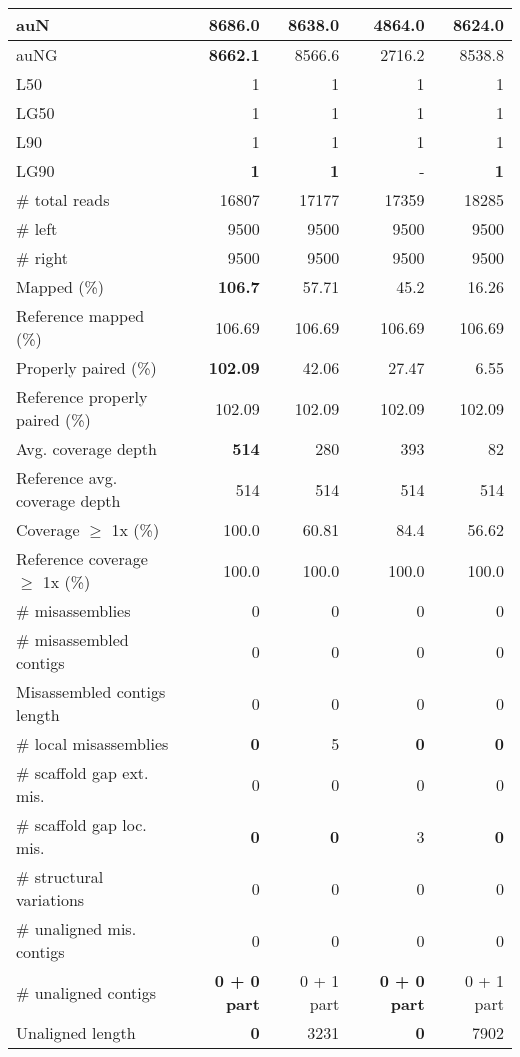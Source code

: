 \documentclass[12pt,a4paper]{article}
\begin{document}
\begin{table}[ht]
\begin{center}
\begin{tabular}{|l*{4}{|r}|}
auN & {\bf 8686.0} & 8638.0 & 4864.0 & 8624.0 \\ \hline
auNG & {\bf 8662.1} & 8566.6 & 2716.2 & 8538.8 \\ \hline
L50 & 1 & 1 & 1 & 1 \\ \hline
LG50 & 1 & 1 & 1 & 1 \\ \hline
L90 & 1 & 1 & 1 & 1 \\ \hline
LG90 & {\bf 1} & {\bf 1} & - & {\bf 1} \\ \hline
\# total reads & 16807 & 17177 & 17359 & 18285 \\ \hline
\# left & 9500 & 9500 & 9500 & 9500 \\ \hline
\# right & 9500 & 9500 & 9500 & 9500 \\ \hline
Mapped (\%) & {\bf 106.7} & 57.71 & 45.2 & 16.26 \\ \hline
Reference mapped (\%) & 106.69 & 106.69 & 106.69 & 106.69 \\ \hline
Properly paired (\%) & {\bf 102.09} & 42.06 & 27.47 & 6.55 \\ \hline
Reference properly paired (\%) & 102.09 & 102.09 & 102.09 & 102.09 \\ \hline
Avg. coverage depth & {\bf 514} & 280 & 393 & 82 \\ \hline
Reference avg. coverage depth & 514 & 514 & 514 & 514 \\ \hline
Coverage $\geq$ 1x (\%) & 100.0 & 60.81 & 84.4 & 56.62 \\ \hline
Reference coverage $\geq$ 1x (\%) & 100.0 & 100.0 & 100.0 & 100.0 \\ \hline
\# misassemblies & 0 & 0 & 0 & 0 \\ \hline
\# misassembled contigs & 0 & 0 & 0 & 0 \\ \hline
Misassembled contigs length & 0 & 0 & 0 & 0 \\ \hline
\# local misassemblies & {\bf 0} & 5 & {\bf 0} & {\bf 0} \\ \hline
\# scaffold gap ext. mis. & 0 & 0 & 0 & 0 \\ \hline
\# scaffold gap loc. mis. & {\bf 0} & {\bf 0} & 3 & {\bf 0} \\ \hline
\# structural variations & 0 & 0 & 0 & 0 \\ \hline
\# unaligned mis. contigs & 0 & 0 & 0 & 0 \\ \hline
\# unaligned contigs & {\bf 0 + 0 part} & 0 + 1 part & {\bf 0 + 0 part} & 0 + 1 part \\ \hline
Unaligned length & {\bf 0} & 3231 & {\bf 0} & 7902 \\ \hline

\end{tabular}
\end{center}
\end{table}
\end{document}
